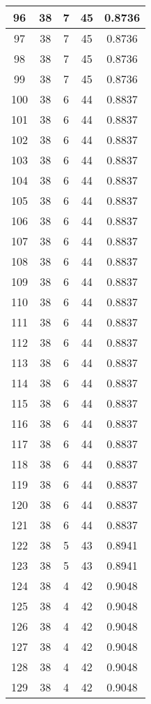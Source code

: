 \documentclass[letterpaper, 12pt]{article}
\begin{document}
\begin{longtable}{|c|c|c|c|c|}
\hline
96 & 38 & 7 & 45 & 0.8736 \\
\hline
97 & 38 & 7 & 45 & 0.8736 \\
\hline
98 & 38 & 7 & 45 & 0.8736 \\
\hline
99 & 38 & 7 & 45 & 0.8736 \\
\hline
100 & 38 & 6 & 44 & 0.8837 \\
\hline
101 & 38 & 6 & 44 & 0.8837 \\
\hline
102 & 38 & 6 & 44 & 0.8837 \\
\hline
103 & 38 & 6 & 44 & 0.8837 \\
\hline
104 & 38 & 6 & 44 & 0.8837 \\
\hline
105 & 38 & 6 & 44 & 0.8837 \\
\hline
106 & 38 & 6 & 44 & 0.8837 \\
\hline
107 & 38 & 6 & 44 & 0.8837 \\
\hline
108 & 38 & 6 & 44 & 0.8837 \\
\hline
109 & 38 & 6 & 44 & 0.8837 \\
\hline
110 & 38 & 6 & 44 & 0.8837 \\
\hline
111 & 38 & 6 & 44 & 0.8837 \\
\hline
112 & 38 & 6 & 44 & 0.8837 \\
\hline
113 & 38 & 6 & 44 & 0.8837 \\
\hline
114 & 38 & 6 & 44 & 0.8837 \\
\hline
115 & 38 & 6 & 44 & 0.8837 \\
\hline
116 & 38 & 6 & 44 & 0.8837 \\
\hline
117 & 38 & 6 & 44 & 0.8837 \\
\hline
118 & 38 & 6 & 44 & 0.8837 \\
\hline
119 & 38 & 6 & 44 & 0.8837 \\
\hline
120 & 38 & 6 & 44 & 0.8837 \\
\hline
121 & 38 & 6 & 44 & 0.8837 \\
\hline
122 & 38 & 5 & 43 & 0.8941 \\
\hline
123 & 38 & 5 & 43 & 0.8941 \\
\hline
124 & 38 & 4 & 42 & 0.9048 \\
\hline
125 & 38 & 4 & 42 & 0.9048 \\
\hline
126 & 38 & 4 & 42 & 0.9048 \\
\hline
127 & 38 & 4 & 42 & 0.9048 \\
\hline
128 & 38 & 4 & 42 & 0.9048 \\
\hline
129 & 38 & 4 & 42 & 0.9048 \\

\end{longtable}
\end{document}
